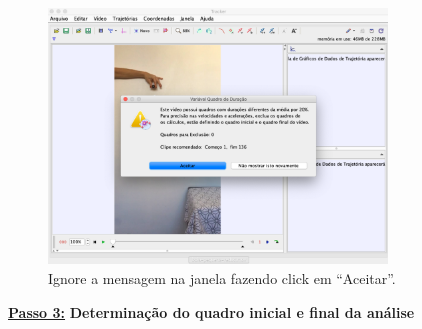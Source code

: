 \documentclass[12pt]{article}
\begin{document}
\begin{figure}[h!]
\includegraphics[width=9cm]{fig2AppB.pdf}
\caption{Ignore a mensagem na janela fazendo click em ``Aceitar''.}
\label{fig2AppB}
\end{figure}

\underline{\bf Passo 3:} {\bf Determinação do quadro inicial e final da análise}\\
\indent 
\end{document}
